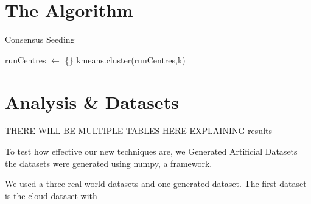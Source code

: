 \documentclass[12pt]{dalthesis}
\newcommand*{\kmeans}{\textsc{K-Means} } %
\begin{document}
\section{The Algorithm}



\begin{algorithm}[H]
  \caption{Consensus Seeding}
  \SetAlgoLined
  \BlankLine
  \BlankLine
  runCentres $\leftarrow$ \{\}\;
  \Return kmeans.cluster(runCentres,k)
\end{algorithm}

\section{Analysis \& Datasets}
THERE WILL BE MULTIPLE TABLES HERE EXPLAINING results

To test how effective our new techniques are, we 
Generated Artificial Datasets the datasets were generated using numpy, a framework.

We used a three real world datasets and one generated dataset. The first dataset is the cloud dataset with 
\end{document}

